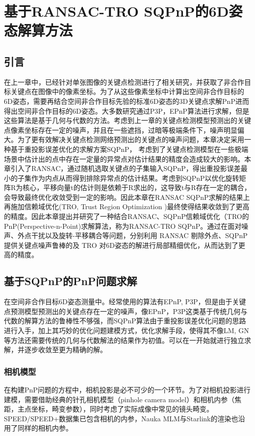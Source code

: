 \chapter{基于RANSAC-TRO SQPnP的6D姿态解算方法}
\label{chap:RANSAC-TRO-SQPnP}

\section{引言}
\label{sec:RANSAC-TRO-SQPnP:intro}
在上一章中，已经针对单张图像的关键点检测进行了相关研究，并获取了非合作目标关键点在图像中的像素坐标。为了从这些像素坐标中计算出空间非合作目标的6D姿态，需要再结合空间非合作目标先验的标准6D姿态的3D关键点求解PnP进而得出空间非合作目标的6D姿态。大多数研究通过P3P\cite{chen2019satellite,s22218541,Guo_2022}，EPnP\cite{li2022learning,huan2020pose,lotti2022investigating}算法进行求解，但是这些算法是基于几何与代数的方法。考虑到上一章的关键点检测模型预测出的关键点像素坐标存在一定的噪声，并且在一些遮挡，过暗等极端条件下，噪声明显偏大。为了更有效解决关键点检测网络预测出的关键点的噪声问题，本章决定采用一种基于重投影误差优化的求解方案SQPnP\cite{terzakis2020consistently}， 考虑到了关键点检测模型在一些极端场景中估计出的点中存在一定量的异常点对估计结果的精度会造成较大的影响。本章引入了RANSAC，通过随机选取关键点的子集输入SQPnP，得出重投影误差最小的子集作为内点从而得到排除异常点的估计结果。考虑到SQPnP以优化旋转矩阵R为核心，平移向量t的估计则是依赖于R求出的，这导致t与R存在一定的耦合，会导致最终优化收敛受到一定的影响。因此本章在RANSAC SQPnP求解的结果上再施加信赖域优化(TRO, Trust Region Optimization )最终使得结果收敛到了更高的精度。因此本章提出并研究了一种结合RANSAC、SQPnP信赖域优化（TRO的PnP(Perspective-n-Point)求解算法，称为RANSAC-TRO SQPnP。通过在面对噪声、外点干扰以及旋转-平移耦合等问题，分别利用 RANSAC 剔除外点、SQPnP 提供关键点噪声鲁棒的及 TRO 对6D姿态的解进行局部精细优化，从而达到了更高的精度。


\section{基于SQPnP的PnP问题求解}
\label{sec:RANSAC-TRO-SQPnP:SQPnP}
在空间非合作目标6D姿态测量中。经常使用的算法有EPnP, P3P，但是由于关键点预测模型预测出的关键点存在一定的噪声，像EPnP，P3P这类基于传统几何与代数的解算方法的鲁棒性不够强，而SQPnP算法\cite{terzakis2020consistently}由于重投影误差优化问题的思路进行入手，加上其巧妙的优化问题建模方式，优化求解手段，使得其不像LM, GN等方法还需要传统的几何与代数解法的结果作为初值。可以在一开始就进行独立求解，并逐步收敛至更为精确的解。
\subsection{相机模型}
在构建PnP问题的方程中，相机投影是必不可少的一个环节。为了对相机投影进行建模，需要借助经典的针孔相机模型（pinhole camera model）和相机内参（焦距，主点坐标，畸变参数），同时考虑了实际成像中常见的镜头畸变。SPEED/SPEED+数据集已包含相机的内参，Nauka MLM与Starlink的渲染也沿用了同样的相机内参。



